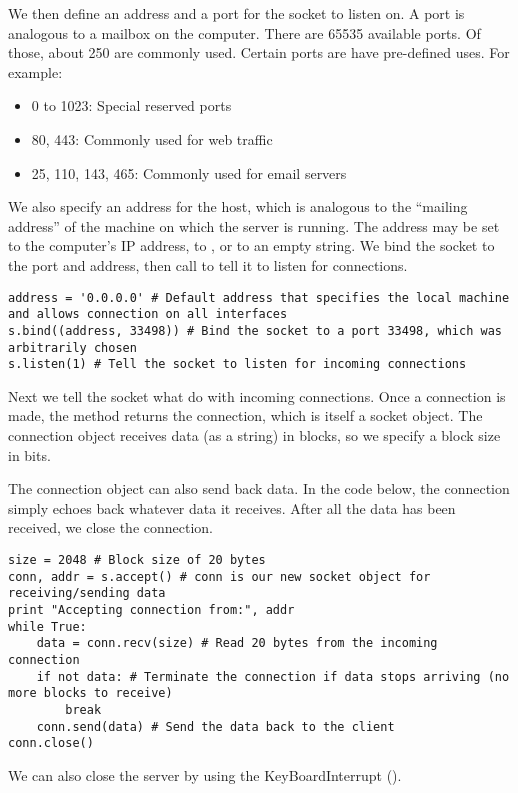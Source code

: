 We then define an address and a port for the socket to listen on.
A port is analogous to a mailbox on the computer.
There are 65535 available ports.
Of those, about 250 are commonly used.
Certain ports are have pre-defined uses. For example:
\begin{itemize}
    \item 0 to 1023: Special reserved ports
    \item  80, 443: Commonly used for web traffic
    \item 25, 110, 143, 465: Commonly used for email servers
\end{itemize}
We also specify an address for the host, which is analogous to the ``mailing address'' of the machine on which the server is running.
The address may be set to the computer's IP address, to , or to an empty string.
We bind the socket to the port and address, then call  to tell it to listen for connections.

\begin{lstlisting}
address = '0.0.0.0' # Default address that specifies the local machine and allows connection on all interfaces
s.bind((address, 33498)) # Bind the socket to a port 33498, which was arbitrarily chosen
s.listen(1) # Tell the socket to listen for incoming connections
\end{lstlisting}

Next we tell the socket what do with incoming connections.
Once a connection is made, the  method returns the connection, which is itself a socket object.
The connection object receives data (as a string) in blocks, so we specify a block size in bits.

The connection object can also send back data.
In the code below, the connection simply echoes back whatever data it receives.
After all the data has been received, we close the connection.

\begin{lstlisting}
size = 2048 # Block size of 20 bytes
conn, addr = s.accept() # conn is our new socket object for receiving/sending data
print "Accepting connection from:", addr
while True:
	data = conn.recv(size) # Read 20 bytes from the incoming connection
	if not data: # Terminate the connection if data stops arriving (no more blocks to receive)
		break
	conn.send(data) # Send the data back to the client
conn.close()
\end{lstlisting}

We can also close the server by using the KeyBoardInterrupt ().

